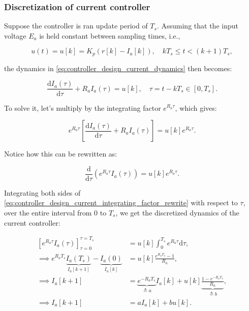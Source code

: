 \subsubsection{Discretization of current controller}
Suppose the controller is ran update period of $T_s$. Assuming that the input voltage $E_a$ is held constant between sampling times, i.e.,

\begin{equation}
    \label{eq:controller_design_discretized_input}
    u(t)=u[k] = K_p (r[k] - I_a[k]), \quad k T_s \leq t < (k+1)T_s,
\end{equation}

the dynamics in \cref{eq:controller_design_current_dynamics} then becomes:

\begin{equation}
    \label{eq:controller_design_current_interval_dynamics}
    \frac{\mathrm{d}I_a(\tau)}{\mathrm{d}\tau} + R_a I_a(\tau) = u[k], \quad \tau = t - k T_s \in [0, T_s].
\end{equation}

To solve it, let's multiply by the integrating factor $e^{R_a \tau}$, which gives:

\begin{equation}
    \label{eq:controller_design_current_integrating_factor}
    e^{R_a \tau} \left[\frac{\mathrm{d}I_a(\tau)}{\mathrm{d}\tau} + R_a I_a(\tau)\right] = u[k] e^{R_a \tau}.
\end{equation}

Notice how this can be rewritten as:

\begin{equation}
    \label{eq:controller_design_current_integrating_factor_rewrite}
    \frac{\mathrm{d}}{\mathrm{d}\tau} \left(e^{R_a \tau} I_a(\tau)\right) = u[k] e^{R_a \tau}.
\end{equation}

Integrating both sides of \cref{eq:controller_design_current_integrating_factor_rewrite} with respect to $\tau$, over the entire interval from $0$ to $T_s$, we get the discretized dynamics of the current controller:

\begin{equation}
    \label{eq:controller_design_discretized}
    \begin{aligned}
        [e^{R_a \tau} I_a(\tau)]_{\tau = 0}^{\tau = T_s} &= u[k] \int_0^{T_s} e^{R_a \tau} \mathrm{d}\tau,\\
        \implies e^{R_a T_s} \underbrace{I_a(T_s)}_{I_a[k+1]} - \underbrace{I_a(0)}_{I_a[k]} &= u[k] \frac{e^{R_a T_s} - 1}{R_a},\\
        \implies I_a[k+1] &= \underbrace{e^{-R_a T_s}}_{\triangleq a} I_a[k] + u[k] \underbrace{\frac{1 - e^{-R_a T_s}}{R_a}}_{\triangleq b},\\
        \implies I_a[k+1] &= a I_a[k] + b u[k].
    \end{aligned}
\end{equation}

